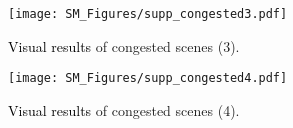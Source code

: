 \documentclass[10pt,twocolumn,letterpaper]{article}
\newcommand{\ywu}[1]{\textcolor{black}{#1}}
\begin{document}
\begin{figure*}[t!] 
\vspace{-1.0em}
  \centering
  \texttt{[image: SM\_Figures/supp\_congested3.pdf]}
  \caption{\ywu{Visual results} of congested scenes (3).}
  \label{supp_fig12} 
  \vspace{-1.5em}
\end{figure*}

\begin{figure*}[t!] 
\vspace{-1.0em}
  \centering
  \texttt{[image: SM\_Figures/supp\_congested4.pdf]}
  \caption{\ywu{Visual results} of congested scenes (4).}
  \label{supp_fig13} 
  \vspace{-1.5em}
\end{figure*}
\end{document}

